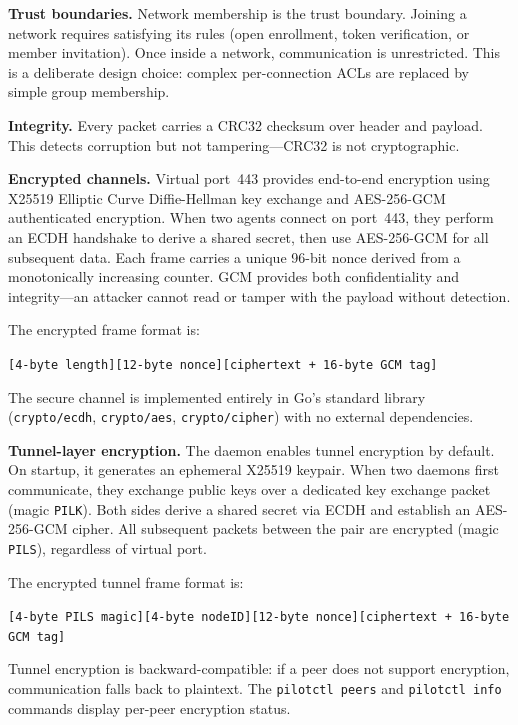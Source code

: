 \documentclass[11pt,a4paper]{article}
\begin{document}
\textbf{Trust boundaries.} Network membership is the trust boundary. Joining a network requires satisfying its rules (open enrollment, token verification, or member invitation). Once inside a network, communication is unrestricted. This is a deliberate design choice: complex per-connection ACLs are replaced by simple group membership.

\textbf{Integrity.} Every packet carries a CRC32 checksum over header and payload. This detects corruption but not tampering---CRC32 is not cryptographic.

\textbf{Encrypted channels.} Virtual port~443 provides end-to-end encryption using X25519 Elliptic Curve Diffie-Hellman key exchange and AES-256-GCM authenticated encryption. When two agents connect on port~443, they perform an ECDH handshake to derive a shared secret, then use AES-256-GCM for all subsequent data. Each frame carries a unique 96-bit nonce derived from a monotonically increasing counter. GCM provides both confidentiality and integrity---an attacker cannot read or tamper with the payload without detection.

The encrypted frame format is:

\begin{center}
\texttt{[4-byte length][12-byte nonce][ciphertext + 16-byte GCM tag]}
\end{center}

The secure channel is implemented entirely in Go's standard library (\texttt{crypto/ecdh}, \texttt{crypto/aes}, \texttt{crypto/cipher}) with no external dependencies.

\textbf{Tunnel-layer encryption.} The daemon enables tunnel encryption by default. On startup, it generates an ephemeral X25519 keypair. When two daemons first communicate, they exchange public keys over a dedicated key exchange packet (magic \texttt{PILK}). Both sides derive a shared secret via ECDH and establish an AES-256-GCM cipher. All subsequent packets between the pair are encrypted (magic \texttt{PILS}), regardless of virtual port.

The encrypted tunnel frame format is:

\begin{center}
\texttt{[4-byte PILS magic][4-byte nodeID][12-byte nonce][ciphertext + 16-byte GCM tag]}
\end{center}

Tunnel encryption is backward-compatible: if a peer does not support encryption, communication falls back to plaintext. The \texttt{pilotctl peers} and \texttt{pilotctl info} commands display per-peer encryption status.
\end{document}
